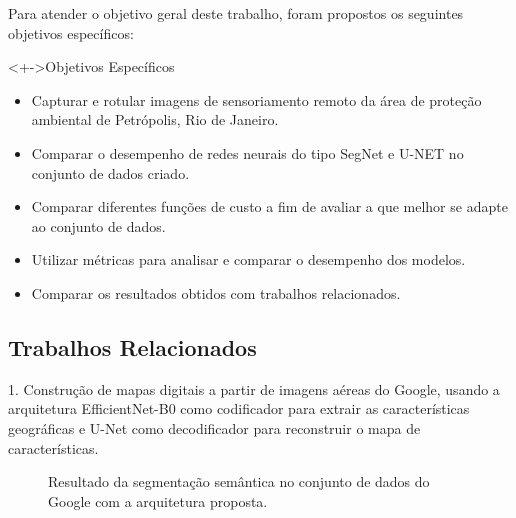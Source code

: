 \documentclass[%
  10pt,%
  aspectratio = 169,%
  compress,%
  t,%
  english,%
  brazilian,%
  tikz,
]{beamer}
\begin{document}
\begin{frame}
Para atender o objetivo geral deste trabalho, foram propostos os seguintes objetivos específicos:

\begin{block}<+->{Objetivos Específicos}
\begin{itemize}
\item Capturar e rotular imagens de sensoriamento remoto da área de proteção ambiental de
Petrópolis, Rio de Janeiro.
\item Comparar o desempenho de redes neurais do tipo SegNet e U-NET no conjunto de dados criado.
\item Comparar diferentes funções de custo a fim de avaliar a que melhor se adapte ao conjunto
de dados.
\item Utilizar métricas para analisar e comparar o desempenho dos modelos.
\item Comparar os resultados obtidos com trabalhos relacionados.
\end{itemize}
\end{block}
\end{frame}

\subsection{Trabalhos Relacionados}\label{sec:intro3}

\begin{frame}
    1.  Construção de mapas digitais a partir de imagens aéreas do Google, usando a arquitetura EfficientNet-B0 como codificador para extrair as características geográficas e U-Net como decodificador para reconstruir o mapa de características\textbf{\cite{Khanh2021}}.
    \begin{figure}[!htb]
        \centering%
        \caption{Resultado da segmentação semântica no conjunto de dados do Google com a arquitetura proposta.}%
        \label{fig:khan01}
    \end{figure}
    
\end{frame}
\end{document}
